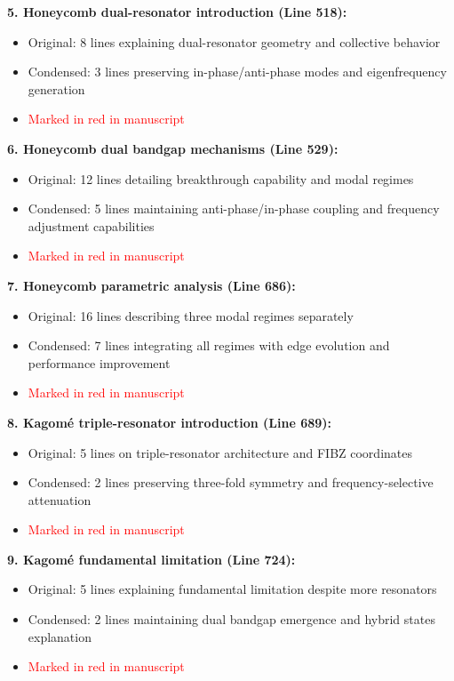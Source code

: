 \documentclass[11pt,a4paper]{article}
\newenvironment{changesbox}{%
    \par\medskip\noindent{\color{changescolor}\rule{\linewidth}{2pt}}\par
    \noindent{\color{changescolor}\bfseries Manuscript Changes}\par\smallskip
}{%
    \par\noindent{\color{changescolor}\rule{\linewidth}{0.5pt}}\medskip
}
\begin{document}
\begin{changesbox}
\textbf{5. Honeycomb dual-resonator introduction (Line 518):}
\begin{itemize}
    \item Original: 8 lines explaining dual-resonator geometry and collective behavior
    \item Condensed: 3 lines preserving in-phase/anti-phase modes and eigenfrequency generation
    \item \textcolor{red}{Marked in red in manuscript}
\end{itemize}

\textbf{6. Honeycomb dual bandgap mechanisms (Line 529):}
\begin{itemize}
    \item Original: 12 lines detailing breakthrough capability and modal regimes
    \item Condensed: 5 lines maintaining anti-phase/in-phase coupling and frequency adjustment capabilities
    \item \textcolor{red}{Marked in red in manuscript}
\end{itemize}

\textbf{7. Honeycomb parametric analysis (Line 686):}
\begin{itemize}
    \item Original: 16 lines describing three modal regimes separately
    \item Condensed: 7 lines integrating all regimes with edge evolution and performance improvement
    \item \textcolor{red}{Marked in red in manuscript}
\end{itemize}

\textbf{8. Kagom\'{e} triple-resonator introduction (Line 689):}
\begin{itemize}
    \item Original: 5 lines on triple-resonator architecture and FIBZ coordinates
    \item Condensed: 2 lines preserving three-fold symmetry and frequency-selective attenuation
    \item \textcolor{red}{Marked in red in manuscript}
\end{itemize}

\textbf{9. Kagom\'{e} fundamental limitation (Line 724):}
\begin{itemize}
    \item Original: 5 lines explaining fundamental limitation despite more resonators
    \item Condensed: 2 lines maintaining dual bandgap emergence and hybrid states explanation
    \item \textcolor{red}{Marked in red in manuscript}
\end{itemize}


\end{changesbox}
\end{document}
